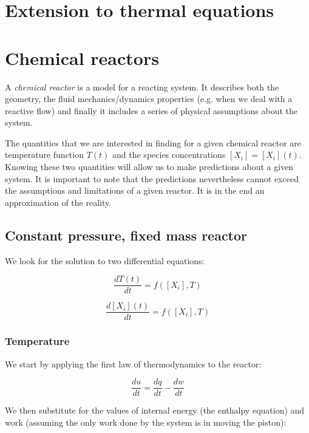 \documentclass[10pt,twocolumn]{article}
\begin{document}
\section{Extension to thermal equations}




\section{Chemical reactors}

A \textit{chemical reactor} is a model for a reacting system. It describes both the geometry, the fluid mechanics/dynamics properties (e.g. when we deal with a reactive flow) and finally it includes a series of physical assumptions about the system.

The quantities that we are interested in finding for a given chemical reactor are temperature function $T(t)$ and the species concentrations $[X_i] = [X_i](t)$. Knowing these two quantities will allow us to make predictions about a given system. It is important to note that the predictions nevertheless cannot exceed the assumptions and limitations of a given reactor. It is in the end an approximation of the reality.

\subsection{Constant pressure, fixed mass reactor}

We look for the solution to two differential equations:

\begin{equation}
\frac{d T(t)}{dt} = f([X_i], T)
\end{equation}

\begin{equation}
\frac{d [X_i](t)}{dt} = f([X_i], T)
\end{equation}

\subsubsection{Temperature}

We start by applying the first law of thermodynamics to the reactor:

\begin{equation}
\frac{du}{dt} = \frac{dq}{dt} - \frac{dw}{dt}
\end{equation}

We then substitute for the values of internal energy (the enthalpy equation) and work (assuming the only work done by the system is in moving the piston):
\end{document}
